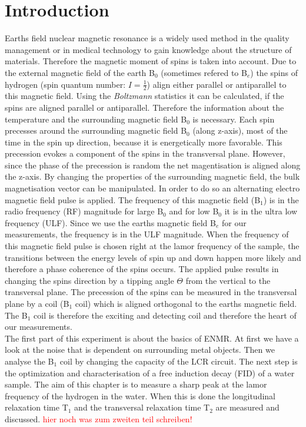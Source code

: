\section{Introduction}
\label{sec:Introduction}
Earths field nuclear magnetic resonance is a widely used method in the quality management or in medical technology to gain knowledge about the structure of materials. Therefore the magnetic moment of spins is taken into account.\newline
Due to the external magnetic field of the earth B$_0$ (sometimes refered to B$_e$) the spins of hydrogen (spin quantum number: $I=\frac{1}{2}$) align either parallel or antiparallel to this magnetic field. Using the \textit{Boltzmann} statistics it can be calculated, if the spins are aligned parallel or antiparallel. Therefore the information about the temperature and the surrounding magnetic field B$_0$ is necessary. Each spin precesses around the surrounding magnetic field B$_0$ (along z-axis), most of the time in the spin up direction, because it is energetically more favorable. This precession evokes a component of the spins in the transversal plane. However, since the phase of the precession is random the net magentisation is aligned along the z-axis. By changing the properties of the surrounding magnetic field, the bulk magnetisation vector can be manipulated. In order to do so an alternating electro magnetic field pulse is applied. The frequency of this magnetic field (B$_1$) is in the radio frequency (RF) magnitude for large B$_0$ and for low B$_0$ it is in the ultra low frequency (ULF). Since we use the earths magnetic field B$_e$ for our measurements, the frequency is in the ULF magnitude. When the frequency of this magnetic field pulse is chosen right at the lamor frequency of the sample, the transitions between the energy levels of spin up and down happen more likely and therefore a phase coherence of the spins occurs. The applied pulse results in changing the spins direction by a tipping angle $\Theta$ from the vertical to the transversal plane. The precession of the spins can be measured in the transversal plane by a coil (B$_1$ coil) which is aligned orthogonal to the earths magnetic field. The B$_1$ coil is therefore the exciting and detecting coil and therefore the heart of our measurements. \\
The first part of this experiment is about the basics of ENMR. At first we have a look at the noise that is dependent on surrounding metal objects. Then we analyse the B$_1$ coil by changing the capacity of the LCR circuit. The next step is the optimization and characterisation of a free induction decay (FID) of a water sample. The aim of this chapter is to measure a sharp peak at the lamor frequency of the hydrogen in the water. When this is done the longitudinal relaxation time T$_1$ and the transversal relaxation time T$_2$ are measured and discussed.
\textcolor{red}{hier noch was zum zweiten teil schreiben!}
